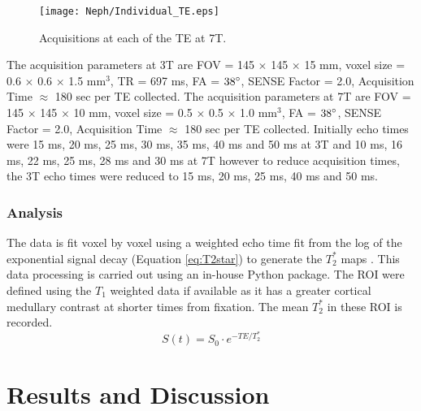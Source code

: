 \begin{figure}[H]
	\centering
	\texttt{[image: Neph/Individual\_TE.eps]}
	\caption{Acquisitions at each of the \ac{TE} at 7T.}
	\label{fig:echo_raw_data}	
\end{figure}

The acquisition parameters at 3T are \ac{FOV} = 145 $\times$ 145 $\times$ 15 mm, voxel size = 0.6 $\times$ 0.6 $\times$ 1.5 mm$^3$, \ac{TR} = 697 ms, \ac{FA} = $38\degree$, \ac{SENSE} Factor = 2.0, Acquisition Time $\approx$ 180 sec per \ac{TE} collected. 
The acquisition parameters at 7T are \ac{FOV} = 145 $\times$ 145 $\times$ 10 mm, voxel size = 0.5 $\times$ 0.5 $\times$ 1.0 mm$^3$, \ac{FA} = $38\degree$, \ac{SENSE} Factor = 2.0, Acquisition Time $\approx$ 180 sec per \ac{TE} collected. Initially echo times were 15 ms, 20 ms, 25 ms, 30 ms, 35 ms, 40 ms and 50 ms at 3T and 10 ms, 16 ms, 22 ms, 25 ms, 28 ms and 30 ms at 7T however to reduce acquisition times, the 3T echo times were reduced to 15 ms, 20 ms, 25 ms, 40 ms and 50 ms.

\subsubsection{Analysis}
The data is fit voxel by voxel using a weighted echo time fit from the log of the exponential signal decay (Equation \eqref{eq:T2star}) to generate the $T_2^*$ maps \cite{cox_multiparametric_2017}. This data processing is carried out using an in-house Python package. The \ac{ROI} were defined using the $T_1$ weighted data if available as it has a greater cortical medullary contrast at shorter times from fixation. The mean $T_2^*$ in these \ac{ROI} is recorded.
\begin{equation}
S(t) = S_0 \cdot e^{-TE/T_2^*}
\label{eq:T2star}
\end{equation}

\newpage
\section{Results and Discussion}
\label{sec:neph_results}


